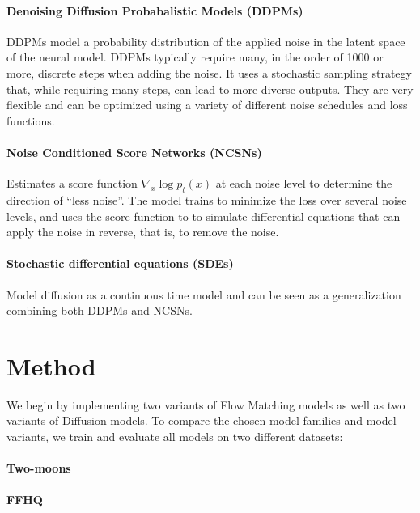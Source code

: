 \documentclass{article}
\begin{document}
\paragraph{Denoising Diffusion Probabalistic Models (DDPMs)} 
DDPMs model a probability distribution of the applied noise in the latent space of the neural model. DDPMs typically require many, in the order of 1000 or more, discrete steps when adding the noise. It uses a stochastic sampling strategy that, while requiring many steps, can lead to more diverse outputs. They are very flexible and can be optimized using a variety of different noise schedules and loss functions.

\paragraph{Noise Conditioned Score Networks (NCSNs)} 
Estimates a score function $\nabla_x \log p_t(x)$ at each noise level to determine the direction of ``less noise''. The model trains to minimize the loss over several noise levels, and uses the score function to to simulate differential equations that can apply the noise in reverse, that is, to remove the noise.

\paragraph{Stochastic differential equations (SDEs)} 
Model diffusion as a continuous time model and can be seen as a generalization combining both DDPMs and NCSNs.

\section{Method}

We begin by implementing two variants of Flow Matching models as well as two variants of Diffusion models. To compare the chosen model families and model variants, we train and evaluate all models on two different datasets:

\paragraph{Two-moons}

\paragraph{FFHQ}




\end{document}
